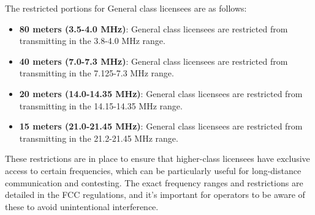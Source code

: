 The restricted portions for General class licensees are as follows:
\begin{itemize}
    \item \textbf{80 meters (3.5-4.0 MHz)}: General class licensees are restricted from transmitting in the 3.8-4.0 MHz range.
    \item \textbf{40 meters (7.0-7.3 MHz)}: General class licensees are restricted from transmitting in the 7.125-7.3 MHz range.
    \item \textbf{20 meters (14.0-14.35 MHz)}: General class licensees are restricted from transmitting in the 14.15-14.35 MHz range.
    \item \textbf{15 meters (21.0-21.45 MHz)}: General class licensees are restricted from transmitting in the 21.2-21.45 MHz range.
\end{itemize}

These restrictions are in place to ensure that higher-class licensees have exclusive access to certain frequencies, which can be particularly useful for long-distance communication and contesting. The exact frequency ranges and restrictions are detailed in the FCC regulations, and it’s important for operators to be aware of these to avoid unintentional interference.

